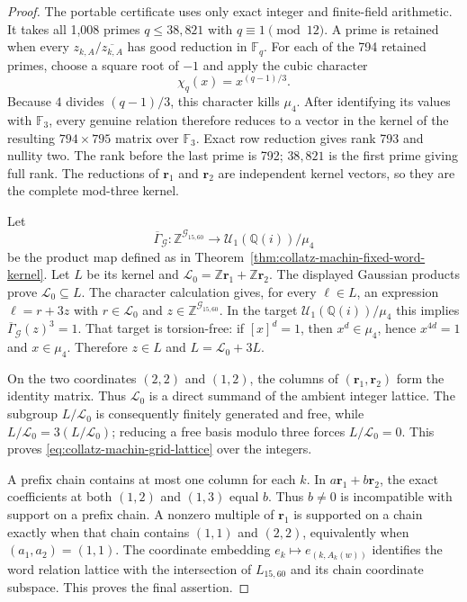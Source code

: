 \begin{proof}
The portable certificate
 uses only exact
integer and finite-field arithmetic.  It takes all 1,008 primes
$q\leq38{,}821$ with $q\equiv1\pmod{12}$.  A prime is retained when every
$z_{k,A}/\overline{z_{k,A}}$ has good reduction in $\mathbb F_q$.  For each
of the 794 retained primes, choose a square root of $-1$ and apply the cubic
character
\[
 \chi_q(x)=x^{(q-1)/3}.
\]
Because $4$ divides $(q-1)/3$, this character kills $\mu_4$.  After identifying
its values with $\mathbb F_3$, every genuine relation therefore reduces to a
vector in the kernel of the resulting $794\times795$ matrix over
$\mathbb F_3$.  Exact row reduction gives rank 793 and nullity two.  The rank
before the last prime is 792; $38{,}821$ is the first prime giving full rank.
The reductions of $\mathbf r_1$ and $\mathbf r_2$ are independent kernel
vectors, so they are the complete mod-three kernel.

Let
\[
 \overline\Gamma_{\mathcal G}:\mathbb Z^{\mathcal G_{15,60}}
 \longrightarrow\mathcal U_1(\mathbb Q(i))/\mu_4
\]
be the product map defined as in
Theorem~\ref{thm:collatz-machin-fixed-word-kernel}.  Let $L$ be its kernel and
$\mathcal L_0=\mathbb Z\mathbf r_1+\mathbb Z\mathbf r_2$.  The displayed
Gaussian products prove $\mathcal L_0\subseteq L$.  The character calculation
gives, for every $\ell\in L$, an expression $\ell=r+3z$ with
$r\in\mathcal L_0$ and
$z\in\mathbb Z^{\mathcal G_{15,60}}$.  In the target
$\mathcal U_1(\mathbb Q(i))/\mu_4$ this implies
$\overline\Gamma_{\mathcal G}(z)^3=1$.
That target is torsion-free: if $[x]^d=1$, then $x^d\in\mu_4$, hence
$x^{4d}=1$ and $x\in\mu_4$.  Therefore $z\in L$ and
$L=\mathcal L_0+3L$.

On the two coordinates $(2,2)$ and $(1,2)$, the columns of
$(\mathbf r_1,\mathbf r_2)$ form the identity matrix.  Thus $\mathcal L_0$ is a direct
summand of the ambient integer lattice.  The subgroup $L/\mathcal L_0$ is
consequently finitely generated and free, while
$L/\mathcal L_0=3(L/\mathcal L_0)$; reducing a free basis modulo three forces
$L/\mathcal L_0=0$.
This proves \eqref{eq:collatz-machin-grid-lattice} over the integers.

A prefix chain contains at most one column for each $k$.  In
$a\mathbf r_1+b\mathbf r_2$, the exact coefficients at both $(1,2)$ and
$(1,3)$ equal $b$.
Thus $b\ne0$ is incompatible with support on a prefix chain.  A nonzero
multiple of $\mathbf r_1$ is supported
on a chain exactly when that chain contains $(1,1)$ and $(2,2)$, equivalently
when $(a_1,a_2)=(1,1)$.  The coordinate embedding
$e_k\mapsto e_{(k,A_k(w))}$ identifies the word relation lattice with the
intersection of $L_{15,60}$ and its chain coordinate subspace.  This proves
the final assertion.
\end{proof}

